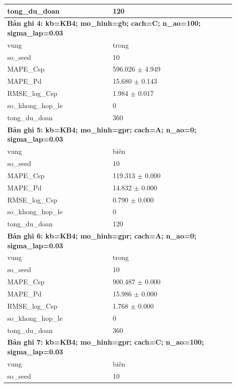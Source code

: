 \begin{longtable}{p{0.43\linewidth}p{0.50\linewidth}}
tong\_\allowbreak du\_\allowbreak doan & 120 \\
\midrule
\multicolumn{2}{p{0.95\linewidth}}{\textbf{Bản ghi 4: kb=KB4; mo\_hinh=gb; cach=C; n\_ao=100; sigma\_lap=0.03}} \\
vung & trong \\
so\_\allowbreak seed & 10 \\
MAPE\_\allowbreak Csp & 596.026 $\pm$ 4.949 \\
MAPE\_\allowbreak Pd & 15.680 $\pm$ 0.143 \\
RMSE\_\allowbreak log\_\allowbreak Csp & 1.984 $\pm$ 0.017 \\
so\_\allowbreak khong\_\allowbreak hop\_\allowbreak le & 0 \\
tong\_\allowbreak du\_\allowbreak doan & 360 \\
\midrule
\multicolumn{2}{p{0.95\linewidth}}{\textbf{Bản ghi 5: kb=KB4; mo\_hinh=gpr; cach=A; n\_ao=0; sigma\_lap=0.03}} \\
vung & biên \\
so\_\allowbreak seed & 10 \\
MAPE\_\allowbreak Csp & 119.313 $\pm$ 0.000 \\
MAPE\_\allowbreak Pd & 14.832 $\pm$ 0.000 \\
RMSE\_\allowbreak log\_\allowbreak Csp & 0.790 $\pm$ 0.000 \\
so\_\allowbreak khong\_\allowbreak hop\_\allowbreak le & 0 \\
tong\_\allowbreak du\_\allowbreak doan & 120 \\
\midrule
\multicolumn{2}{p{0.95\linewidth}}{\textbf{Bản ghi 6: kb=KB4; mo\_hinh=gpr; cach=A; n\_ao=0; sigma\_lap=0.03}} \\
vung & trong \\
so\_\allowbreak seed & 10 \\
MAPE\_\allowbreak Csp & 900.487 $\pm$ 0.000 \\
MAPE\_\allowbreak Pd & 15.986 $\pm$ 0.000 \\
RMSE\_\allowbreak log\_\allowbreak Csp & 1.768 $\pm$ 0.000 \\
so\_\allowbreak khong\_\allowbreak hop\_\allowbreak le & 0 \\
tong\_\allowbreak du\_\allowbreak doan & 360 \\
\midrule
\multicolumn{2}{p{0.95\linewidth}}{\textbf{Bản ghi 7: kb=KB4; mo\_hinh=gpr; cach=C; n\_ao=100; sigma\_lap=0.03}} \\
vung & biên \\
so\_\allowbreak seed & 10 \\

\end{longtable}

